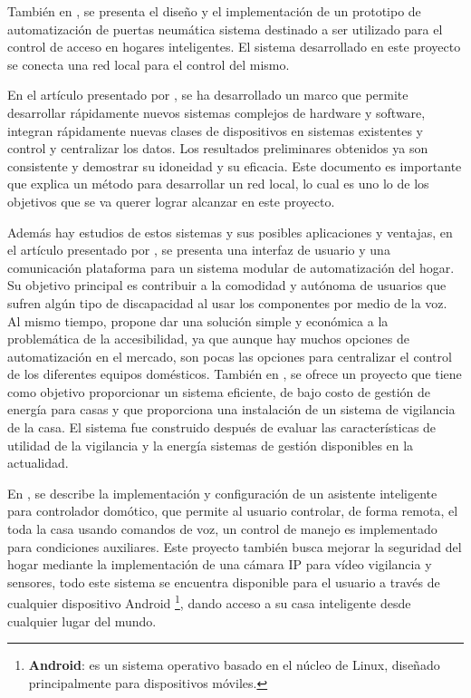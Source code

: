 También en \cite{Lita2017}, se presenta el diseño y el implementación de un prototipo de automatización de puertas neumática sistema destinado a ser utilizado para el control de acceso en hogares inteligentes. El sistema desarrollado en este proyecto se conecta una red local para el control del mismo. 

En el artículo presentado por \cite{Frontoni2017}, se ha desarrollado un marco que permite desarrollar rápidamente nuevos sistemas complejos de hardware y software, integran rápidamente nuevas clases de dispositivos en sistemas existentes y control y centralizar los datos. Los resultados preliminares obtenidos ya son consistente y demostrar su idoneidad y su eficacia. Este documento es importante que explica un método para desarrollar un red local, lo cual es uno lo de los objetivos que se va querer lograr alcanzar en este proyecto.

Además hay estudios de estos sistemas y sus posibles aplicaciones y ventajas, en el  artículo presentado por \cite{Errobidart2017}, se presenta una interfaz de usuario y una comunicación plataforma para un sistema modular de automatización del hogar. Su objetivo principal es contribuir a la comodidad y autónoma de usuarios que sufren algún tipo de discapacidad al usar los componentes por medio de la voz. Al mismo tiempo, propone dar una solución simple y económica a la problemática de la accesibilidad, ya que aunque hay muchos opciones de automatización en el mercado, son pocas las opciones para centralizar el control de los diferentes equipos domésticos. También en \cite{Nayyar2017}, se ofrece un proyecto que tiene como objetivo proporcionar un sistema eficiente, de bajo costo de gestión de energía para casas y que proporciona una instalación de un sistema de vigilancia de la casa. El sistema fue construido después de evaluar las características de utilidad de la vigilancia y la energía sistemas de gestión disponibles en la actualidad.

En \cite{Cabrera2016},  se describe la implementación y configuración de un asistente inteligente para controlador domótico, que permite al usuario controlar, de forma remota, el toda la casa usando comandos de voz, un control de manejo es implementado para condiciones auxiliares. Este proyecto también busca mejorar la seguridad del hogar mediante la implementación de una cámara IP para vídeo vigilancia y sensores, todo este sistema se encuentra disponible para el usuario a través de cualquier dispositivo Android \footnote{\textbf{Android}: es un sistema operativo basado en el núcleo de Linux, diseñado principalmente para dispositivos móviles.}, dando acceso a su casa inteligente desde cualquier lugar del mundo. 

